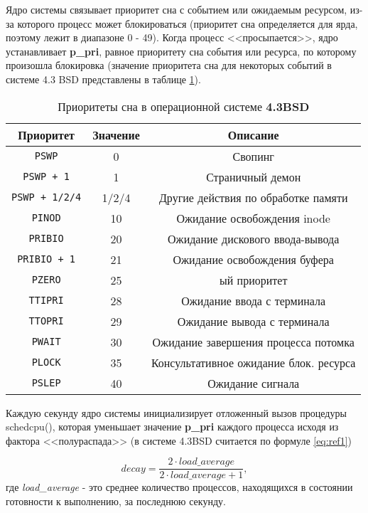 Ядро системы связывает приоритет сна с событием или ожидаемым ресурсом, из-за которого процесс может блокироваться (приоритет сна определяется для ярда, поэтому лежит в диапазоне 0 - 49). Когда процесс <<просыпается>>, ядро устанавливает \textbf{p\_pri}, равное приоритету сна события или ресурса, по которому произошла блокировка (значение приоритета сна для некоторых событий в системе 4.3 BSD представлены в таблице \ref{tab:bsd}).
\pagebreak
\begin{table}[!h]
	\caption{Приоритеты сна в операционной системе \textbf{4.3BSD}}
	\label{tab:bsd}
	\begin{center}
		\begin{tabular}{ |c|c|c|  }
			\hline
			\textbf{Приоритет} & \textbf{Значение} & \textbf{Описание} \\
			\hline
			\texttt{PSWP} & 0 & Свопинг \\
			\hline
			\texttt{PSWP + 1} & 1 & Страничный демон \\
			\hline
			\texttt{PSWP + 1/2/4} & 1/2/4 & Другие действия по обработке памяти \\
			\hline
			\texttt{PINOD} & 10 & Ожидание освобождения inode \\
			\hline
			\texttt{PRIBIO} & 20 & Ожидание дискового ввода-вывода \\
			\hline
			\texttt{PRIBIO + 1} & 21 & Ожидание освобождения буфера \\
			\hline
			\texttt{PZERO} & 25 & ый приоритет \\
			\hline
			\texttt{TTIPRI} & 28 & Ожидание ввода с терминала \\
			\hline
			\texttt{TTOPRI} & 29 & Ожидание вывода с терминала \\
			\hline 
			\texttt{PWAIT} & 30 & Ожидание завершения процесса потомка \\
			\hline
			\texttt{PLOCK} & 35 & Консультативное ожидание блок. ресурса \\
			\hline
			\texttt{PSLEP} & 40 & Ожидание сигнала \\
			\hline
		\end{tabular}
	\end{center}
\end{table}

Каждую секунду ядро системы инициализирует отложенный вызов процедуры schedcpu(), которая уменьшает значение \textbf{p\_pri} каждого процесса исходя из фактора <<полураспада>> (в системе 4.3BSD считается по формуле \ref{eq:ref1})

\begin{equation}
	\label{eq:ref1}
	decay = \frac{2 \cdot load\_average}{2 \cdot load\_average + 1} ,
\end{equation} где
\textit{load\_average} - это среднее количество процессов, находящихся в состоянии готовности к выполнению, за последнюю секунду.

